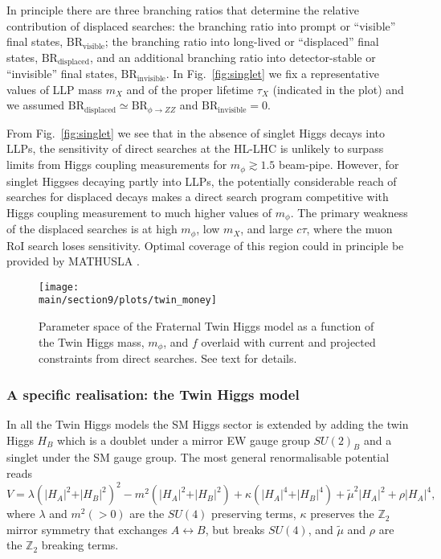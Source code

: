 In principle there are three branching ratios that determine the relative contribution of displaced searches: the branching ratio into prompt or ``visible'' final states, $\text{BR}_{\text{visible}}$; the branching ratio into long-lived or ``displaced'' final states, $\text{BR}_{\text{displaced}}$, and an additional branching ratio into detector-stable or ``invisible'' final states, $\text{BR}_{\text{invisible}}$. In Fig.~\ref{fig:singlet} we fix a representative values of LLP mass $m_X$ and of the proper lifetime $\tau_X$ (indicated in the plot) and we assumed $ \text{BR}_{\text{displaced}} \simeq \text{BR}_{\phi \rightarrow ZZ}$ and $\text{BR}_{\text{invisible}} = 0$. 

From Fig.~\ref{fig:singlet} we see that in the absence of singlet Higgs decays into LLPs, the sensitivity of direct searches at the HL-LHC is unlikely to surpass limits from Higgs coupling measurements for $m_\phi \gtrsim 1.5$ beam-pipe. However, for singlet Higgses decaying partly into LLPs, the potentially considerable reach of searches for displaced decays makes a direct search program competitive with Higgs coupling measurement to much higher values of $m_\phi$. The primary weakness of the displaced searches is at high $m_\phi$, low $m_X$, and large $c \tau$, where the muon RoI search loses sensitivity. Optimal coverage of this region could in principle be provided by MATHUSLA \cite{Curtin:2018mvb}.


\begin{figure}[h!]
\centering
\texttt{[image: \\main/section9/plots/twin\_money]}
\caption{Parameter space of the Fraternal Twin Higgs model as a function of the Twin Higgs mass, $m_\phi$, and $f$ overlaid with current and projected constraints from direct searches. See text for details.
\label{fig:twinmoney}
}
\end{figure}


\subsubsection{A specific realisation: the Twin Higgs model}
In all the Twin Higgs models the SM Higgs sector is extended by adding the twin Higgs $H_B$ which is a doublet under a mirror EW gauge group $SU(2)_B$ and a singlet under the SM gauge group. The most general renormalisable potential reads 
\begin{equation}
V=\lambda\left(\vert H_A\vert^2+\vert H_B\vert^2\right)^2-m^2\left(\vert H_A\vert^2+\vert H_B\vert^2\right)+\kappa\left(\vert H_A\vert^4+\vert H_B\vert^4\right)+\tilde{\mu}^2\vert H_A\vert^2+\rho \vert H_A\vert^4,\label{eq:V_TH}
\end{equation}
where $\lambda$ and $m^2 (>0)$ are the $SU(4)$ preserving terms, $\kappa$ preserves the $\mathbb{Z}_2$ mirror symmetry that exchanges $A\leftrightarrow B$, but breaks $SU(4)$, and $\tilde\mu$ and $\rho$ are the $\mathbb{Z}_2$ breaking terms.

